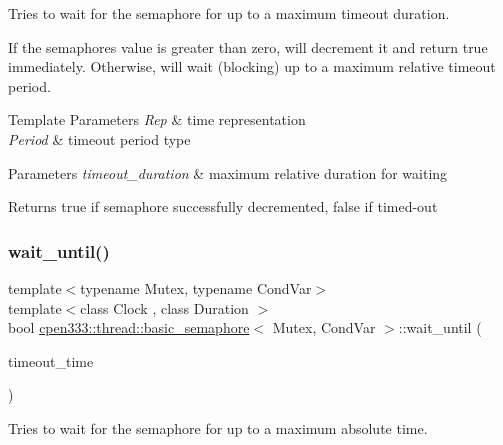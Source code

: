 Tries to wait for the semaphore for up to a maximum timeout duration. 

If the semaphore\textquotesingle{}s value is greater than zero, will decrement it and return true immediately. Otherwise, will wait (blocking) up to a maximum relative timeout period.


\begin{DoxyTemplParams}{Template Parameters}
{\em Rep} & time representation \\
\hline
{\em Period} & timeout period type \\
\hline
\end{DoxyTemplParams}

\begin{DoxyParams}{Parameters}
{\em timeout\+\_\+duration} & maximum relative duration for waiting \\
\hline
\end{DoxyParams}
\begin{DoxyReturn}{Returns}
true if semaphore successfully decremented, false if timed-\/out 
\end{DoxyReturn}
\mbox{\label{classcpen333_1_1thread_1_1basic__semaphore_a19d3b188f86c565acbf83ec4872d9773}} 
\subsubsection{\texorpdfstring{wait\+\_\+until()}{wait\_until()}}
{\footnotesize\ttfamily template$<$typename Mutex, typename Cond\+Var$>$ \\
template$<$class Clock , class Duration $>$ \\
bool \hyperlink{classcpen333_1_1thread_1_1basic__semaphore}{cpen333\+::thread\+::basic\+\_\+semaphore}$<$ Mutex, Cond\+Var $>$\+::wait\+\_\+until (\begin{DoxyParamCaption}\item[{const std\+::chrono\+::time\+\_\+point$<$ Clock, Duration $>$ \&}]{timeout\+\_\+time }\end{DoxyParamCaption})\hspace{0.3cm}{\ttfamily [inline]}}



Tries to wait for the semaphore for up to a maximum absolute time. 

